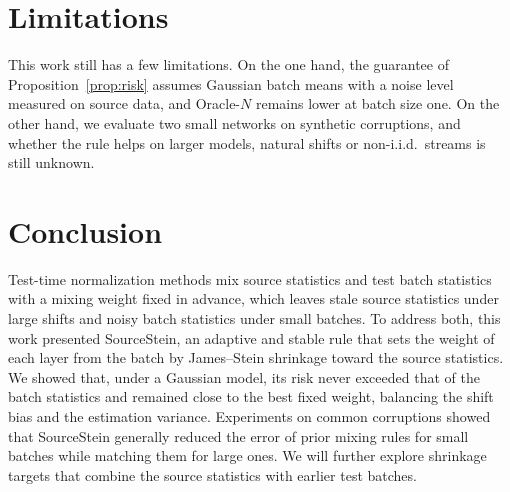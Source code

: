 \section{Limitations} \label{sec:limitations}
This work still has a few limitations.
On the one hand, the guarantee of Proposition~\ref{prop:risk} assumes Gaussian batch means with a noise level measured on source data, and Oracle-$N$ remains lower at batch size one.
On the other hand, we evaluate two small networks on synthetic corruptions, and whether the rule helps on larger models, natural shifts or non-i.i.d.\ streams is still unknown.

\section{Conclusion} \label{sec:conclusion}
Test-time normalization methods mix source statistics and test batch statistics with a mixing weight fixed in advance, which leaves stale source statistics under large shifts and noisy batch statistics under small batches.
To address both, this work presented SourceStein, an adaptive and stable rule that sets the weight of each layer from the batch by James--Stein shrinkage toward the source statistics.
We showed that, under a Gaussian model, its risk never exceeded that of the batch statistics and remained close to the best fixed weight, balancing the shift bias and the estimation variance.
Experiments on common corruptions showed that SourceStein generally reduced the error of prior mixing rules for small batches while matching them for large ones.
We will further explore shrinkage targets that combine the source statistics with earlier test batches.
\label{main-text-end}

